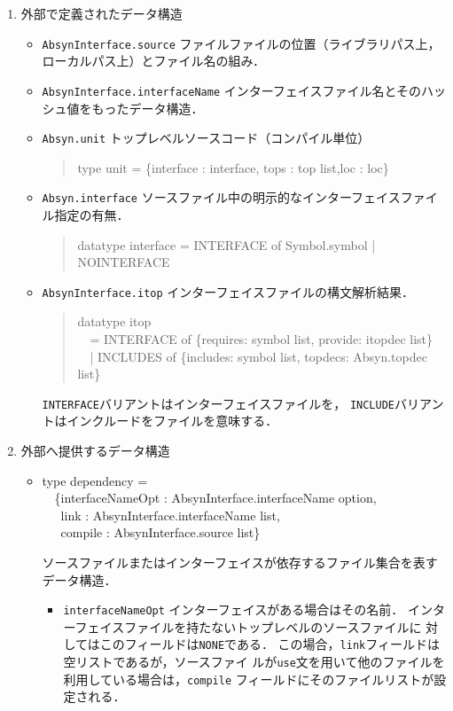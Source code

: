 \documentclass{jbook}
\newcommand{\code}[1]{\mbox{\large\tt #1}}
\newcommand{\myem}{\mbox{\ \ }}
\newenvironment{program}{\begin{quote}\begin{tt}}%
                        {\end{tt}\end{quote}}
\newenvironment{programPlain}{\begin{large}\begin{tt}}%
	                     {\end{tt}\end{large}}
\begin{document}
\begin{enumerate}
\item 外部で定義されたデータ構造
\begin{itemize}
\item \code{AbsynInterface.source}
	ファイルファイルの位置（ライブラリパス上，ローカルパス上）とファイル名の組み．
\item \code{AbsynInterface.interfaceName}
	インターフェイスファイル名とそのハッシュ値をもったデータ構造．
\item \code{Absyn.unit} トップレベルソースコード（コンパイル単位）
\begin{program}
type unit = \{interface : interface, tops : top list,loc : loc\}
\end{program}
\item \code{Absyn.interface}
	ソースファイル中の明示的なインターフェイスファイル指定の有無．
\begin{program}
datatype interface = INTERFACE of Symbol.symbol | NOINTERFACE
\end{program}
\item \code{AbsynInterface.itop}
	インターフェイスファイルの構文解析結果．
\begin{program}
datatype itop\\
\myem  = INTERFACE of \{requires: symbol list, provide: itopdec list\}\\
\myem  | INCLUDES of \{includes: symbol list, topdecs: Absyn.topdec list\}
\end{program}
	\code{INTERFACE}バリアントはインターフェイスファイルを，
\code{INCLUDE}バリアントはインクルードをファイルを意味する．

\end{itemize}
\item 外部へ提供するデータ構造
\begin{itemize}
\item 
\begin{programPlain}
type dependency =\\
\myem      \{interfaceNameOpt : AbsynInterface.interfaceName option,\\
\myem\      link : AbsynInterface.interfaceName list,\\
\myem\      compile : AbsynInterface.source  list\}\\
\end{programPlain}

	ソースファイルまたはインターフェイスが依存するファイル集合を表す
データ構造．
\begin{itemize}
\item \code{interfaceNameOpt} 
	インターフェイスがある場合はその名前．
	インターフェイスファイルを持たないトップレベルのソースファイルに
対してはこのフィールドは\code{NONE}である．
	この場合，\code{link}フィールドは空リストであるが，ソースファイ
ルが\code{use}文を用いて他のファイルを利用している場合は，\code{compile}
フィールドにそのファイルリストが設定される．


\end{itemize}
\end{itemize}
\end{enumerate}
\end{document}
